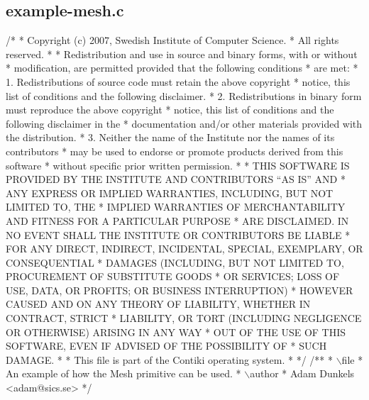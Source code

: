 \hypertarget{a00020}{}\subsection{example-\/mesh.\+c}

\begin{DoxyCodeInclude}
\textcolor{comment}{/*}
\textcolor{comment}{ * Copyright (c) 2007, Swedish Institute of Computer Science.}
\textcolor{comment}{ * All rights reserved.}
\textcolor{comment}{ *}
\textcolor{comment}{ * Redistribution and use in source and binary forms, with or without}
\textcolor{comment}{ * modification, are permitted provided that the following conditions}
\textcolor{comment}{ * are met:}
\textcolor{comment}{ * 1. Redistributions of source code must retain the above copyright}
\textcolor{comment}{ *    notice, this list of conditions and the following disclaimer.}
\textcolor{comment}{ * 2. Redistributions in binary form must reproduce the above copyright}
\textcolor{comment}{ *    notice, this list of conditions and the following disclaimer in the}
\textcolor{comment}{ *    documentation and/or other materials provided with the distribution.}
\textcolor{comment}{ * 3. Neither the name of the Institute nor the names of its contributors}
\textcolor{comment}{ *    may be used to endorse or promote products derived from this software}
\textcolor{comment}{ *    without specific prior written permission.}
\textcolor{comment}{ *}
\textcolor{comment}{ * THIS SOFTWARE IS PROVIDED BY THE INSTITUTE AND CONTRIBUTORS ``AS IS'' AND}
\textcolor{comment}{ * ANY EXPRESS OR IMPLIED WARRANTIES, INCLUDING, BUT NOT LIMITED TO, THE}
\textcolor{comment}{ * IMPLIED WARRANTIES OF MERCHANTABILITY AND FITNESS FOR A PARTICULAR PURPOSE}
\textcolor{comment}{ * ARE DISCLAIMED.  IN NO EVENT SHALL THE INSTITUTE OR CONTRIBUTORS BE LIABLE}
\textcolor{comment}{ * FOR ANY DIRECT, INDIRECT, INCIDENTAL, SPECIAL, EXEMPLARY, OR CONSEQUENTIAL}
\textcolor{comment}{ * DAMAGES (INCLUDING, BUT NOT LIMITED TO, PROCUREMENT OF SUBSTITUTE GOODS}
\textcolor{comment}{ * OR SERVICES; LOSS OF USE, DATA, OR PROFITS; OR BUSINESS INTERRUPTION)}
\textcolor{comment}{ * HOWEVER CAUSED AND ON ANY THEORY OF LIABILITY, WHETHER IN CONTRACT, STRICT}
\textcolor{comment}{ * LIABILITY, OR TORT (INCLUDING NEGLIGENCE OR OTHERWISE) ARISING IN ANY WAY}
\textcolor{comment}{ * OUT OF THE USE OF THIS SOFTWARE, EVEN IF ADVISED OF THE POSSIBILITY OF}
\textcolor{comment}{ * SUCH DAMAGE.}
\textcolor{comment}{ *}
\textcolor{comment}{ * This file is part of the Contiki operating system.}
\textcolor{comment}{ *}
\textcolor{comment}{ */}
\textcolor{comment}{}
\textcolor{comment}{/**}
\textcolor{comment}{ * \(\backslash\)file}
\textcolor{comment}{ *         An example of how the Mesh primitive can be used.}
\textcolor{comment}{ * \(\backslash\)author}
\textcolor{comment}{ *         Adam Dunkels <adam@sics.se>}
\textcolor{comment}{ */}


\end{DoxyCodeInclude}
